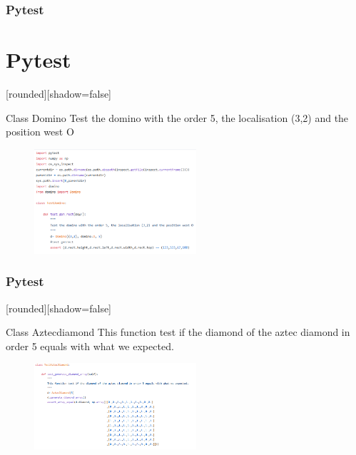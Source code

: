 \documentclass [xcolor=svgnames, t] {beamer}
\begin{document}
\begin{frame}
\frametitle{Pytest}
\section{Pytest}

[rounded][shadow=false] 
\begin{rows}
  \begin{row}
  \begin{block}{Class Domino}
 Test the domino with the order 5, the localisation (3,2) and the position west O 
  
\begin{figure}[!h]
    \begin{center}
   \includegraphics[width=6cm]{pytestdomino.png}
   \end{center}
    \end{figure}
  \end{block}   
  \end{row}
 \end{rows}

\end{frame}

\begin{frame}
\frametitle{Pytest}
[rounded][shadow=false] 
\begin{rows}
  \begin{row}
  \begin{block}{Class Aztecdiamond}
 This function test if the diamond of the aztec diamond in order 5 equals with what we expected.
  
\begin{figure}[!h]
    \begin{center}
   \includegraphics[width=6cm]{pytestaztec.png}
   \end{center}
    \end{figure}
  \end{block}   
  \end{row}
 \end{rows}

\end{frame}
\end{document}
